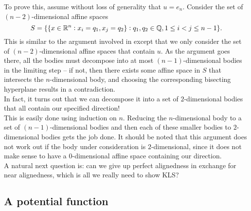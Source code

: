 \documentclass{article}
\begin{document}
		To prove this, assume without loss of generality that $u = e_n$. Consider the set of $(n-2)$-dimensional affine spaces 
		\[ S = \{ \{x \in \mathbb{R}^n : x_i = q_1, x_j = q_2\} : q_1, q_2 \in \mathbb{Q}, 1 \leq i < j \leq n-1 \}. \]
		This is similar to the argument involved in \cite{lov-sim-on7} except that we only consider the set of $(n-2)$-dimensional affine spaces that contain $u$. As the argument goes there, all the bodies must decompose into at most $(n-1)$-dimensional bodies in the limiting step -- if not, then there exists some affine space in $S$ that intersects the $n$-dimensional body, and choosing the corresponding bisecting hyperplane results in a contradiction.\\

		In fact, it turns out that we can decompose it into a set of $2$-dimensional bodies that all contain our specified direction!\\

		This is easily done using induction on $n$. Reducing the $n$-dimensional body to a set of $(n-1)$-dimensional bodies and then each of these smaller bodies to $2$-dimensional bodies gets the job done. It should be noted that this argument does not work out if the body under consideration is $2$-dimensional, since it does not make sense to have a $0$-dimensional affine space containing our direction.\\


		A natural next question is: can we give up perfect alignedness in exchange for near alignedness, which is all we really need to show KLS?

	\subsection{A potential function}
\end{document}
